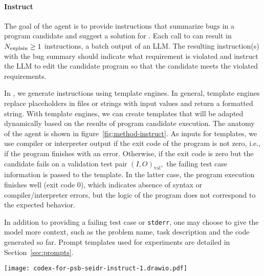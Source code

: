 \paragraph{Instruct}
\label{sec:instruct}

The goal of the \instruct{} agent is to provide instructions that summarize bugs in a program candidate and suggest a solution for \debugmodel{}. 
Each call to \textmodel{} can result in $N_\text{explain}{}\ge1$ instructions, a batch output of an LLM.
The resulting instruction(s) with the bug summary should indicate what requirement is violated and instruct the LLM to edit the candidate program so that the candidate meets the violated requirements. 

In \method{}, we generate instructions using template engines. 
In general, template engines replace placeholders in files or strings with input values and return a formatted string. 
With template engines, we can create templates that will be adapted dynamically based on the results of program candidate execution. 
The anatomy of the \instruct{} agent is shown in figure~\ref{fig:method-instruct}.
As inputs for templates, we use compiler or interpreter output if the exit code of the program is not zero, i.e., if the program finishes with an error.
Otherwise, if the exit code is zero but the candidate fails on a validation test pair $\left( I, O\right)_\text{val},$ the failing test case information is passed to the template. 
In the latter case, the program execution finishes well (exit code 0), which indicates absence of syntax or compiler/interpreter errors, but the logic of the program does not correspond to the expected behavior. 

In addition to providing a failing test case or \texttt{stderr}, one may choose to give the model \textmodel{} more context, such as the problem name, task description and the code generated so far. 
Prompt templates used for experiments are detailed in Section~\ref{sec:prompts}.

\begin{figure*}
    \centering
    \texttt{[image: codex-for-psb-seidr-instruct-1.drawio.pdf]}
    \caption{\instruct{} agent.}
    \label{fig:method-instruct}
    \vspace*{-3ex}
\end{figure*}

